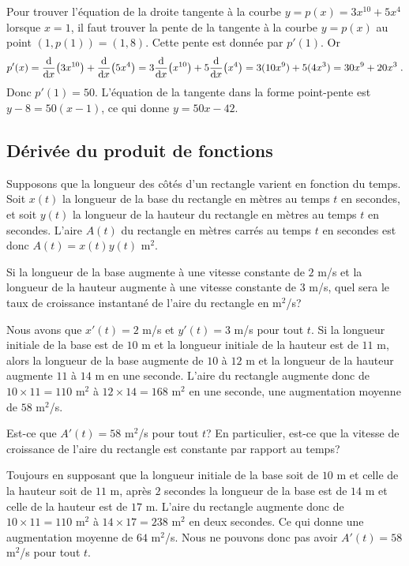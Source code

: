 {\begin{egg}
Pour trouver l'équation de la droite tangente à la courbe
$y = p(x) = 3x^{10} + 5x^4$ lorsque $x=1$, il faut trouver la pente de
la tangente à la courbe $y=p(x)$ au point $(1,p(1)) = (1,8)$.  Cette
pente est donnée par $p'(1)$.  Or
\[
p'(x) = \dfdx{\big(3x^{10}\big)}{x} + \dfdx{\big(5x^4\big)}{x}
= 3 \dfdx{\big(x^{10}\big)}{x} + 5\dfdx{\big(x^4\big)}{x}
= 3 (10x^9) + 5 (4x^3) = 30x^9 + 20x^3 \; .
\]
Donc $p'(1) = 50$.  L'équation de la tangente dans la forme
point-pente est $y - 8 = 50 (x - 1)$, ce qui donne $y = 50x -42$. 
\end{egg}

\subsection{Dérivée du produit de fonctions}

\begin{egg}
Supposons que la longueur des côtés d'un rectangle varient en fonction
du temps.  Soit $x(t)$ la longueur de la base du rectangle en mètres
au temps $t$ en secondes, et soit $y(t)$ la longueur de la hauteur du
rectangle en mètres au temps $t$ en secondes.  L'aire $A(t)$ du
rectangle en mètres carrés au temps $t$ en secondes est donc
$A(t) = x(t) y(t)$ m$^2$.

Si la longueur de la base augmente à une vitesse constante de $2$ m/s
et la longueur de la hauteur augmente à une vitesse constante de $3$
m/s, quel sera le taux de croissance instantané de l'aire du rectangle
en m$^2$/s?

Nous avons que $x'(t) = 2$ m/s et $y'(t) = 3$ m/s pour tout $t$.  Si la
longueur initiale de la base est de $10$ m et la longueur initiale de
la hauteur est de $11$ m, alors la longueur de la base augmente de
$10$ à $12$ m et la longueur de la hauteur augmente $11$ à $14$ m en
une seconde.  L'aire du rectangle augmente donc de
$10\times 11 =110$ m$^2$ à $12\times 14=168$ m$^2$ en une seconde, une
augmentation moyenne de $58$ m$^2$/s.

Est-ce que $A'(t) = 58$ m$^2$/s pour tout $t$?  En particulier, est-ce
que la vitesse de croissance de l'aire du rectangle est constante par
rapport au temps?

Toujours en supposant que la longueur initiale de la base soit de $10$
m et celle de la hauteur soit de $11$ m, après $2$ secondes la
longueur de la base est de $14$ m et celle de la hauteur est de $17$
m.  L'aire du rectangle augmente donc de $10\times 11 = 110$ m$^2$ à
$14\times 17 = 238$ m$^2$ en deux secondes.  Ce qui donne une
augmentation moyenne de $64$ m$^2$/s.  Nous ne pouvons donc pas avoir
$A'(t) = 58$ m$^2$/s pour tout $t$.


\end{egg}}
